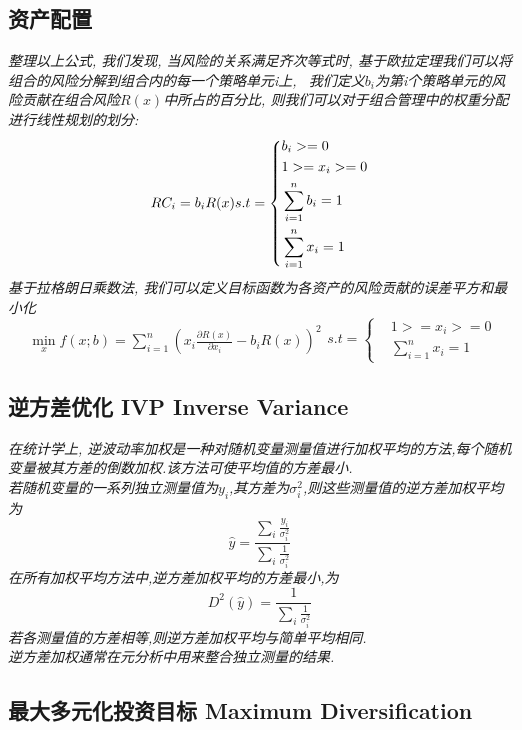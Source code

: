\documentclass{scrartcl}
\numberwithin{equation}{section}
\begin{document}
\subsection{资产配置}
\textsl{整理以上公式, 我们发现, 当风险的关系满足齐次等式时, 基于欧拉定理我们可以将组合的风险分解到组合内的每一个策略单元i上, \
    我们定义$b_i$为第i个策略单元的风险贡献在组合风险$R(x)$中所占的百分比, 则我们可以对于组合管理中的权重分配进行线性规划的划分:}
$$
    RC_i = b_i R(x) \\
    s.t =\left\{
    \begin{aligned}
         & b_i  >=  0             \\
         & 1  >= x_i >=  0        \\
         & \sum_{i=1}^n{b_i}  = 1 \\
         & \sum_{i=1}^n{x_i}  = 1 \\
    \end{aligned}
    \right.
$$
\textsl{基于拉格朗日乘数法, 我们可以定义目标函数为各资产的风险贡献的误差平方和最小化}
\begin{equation}
    \begin{aligned}
        \min_x f(x;b) = \sum_{i=1}^n (x_i \frac {\partial R(x)}{\partial x_i} - b_i R(x))^2
    \end{aligned}
    s.t =\left\{
    \begin{aligned}
         & 1  >= x_i >=  0          \\
         & \sum_{i=1}^n{x_i}   =  1
    \end{aligned}
    \right.
\end{equation}

\subsection{逆方差优化 IVP Inverse Variance}
\textsl{在统计学上, 逆波动率加权是一种对随机变量测量值进行加权平均的方法,每个随机变量被其方差的倒数加权.该方法可使平均值的方差最小.\\若随机变量的一系列独立测量值为$y_i$,其方差为$\sigma_i^2$,则这些测量值的逆方差加权平均为$$\hat{y} =\frac{\sum_i{\frac{y_i}{\sigma_i^2}}}{\sum_i{\frac{1}{\sigma_i^2}}}$$在所有加权平均方法中,逆方差加权平均的方差最小,为$$D^2(\hat{y}) =\frac{1}{\sum_i{\frac{1}{\sigma_i^2}}}$$若各测量值的方差相等,则逆方差加权平均与简单平均相同.\\逆方差加权通常在元分析中用来整合独立测量的结果.
}

\subsection{最大多元化投资目标 Maximum Diversification}
\end{document}
